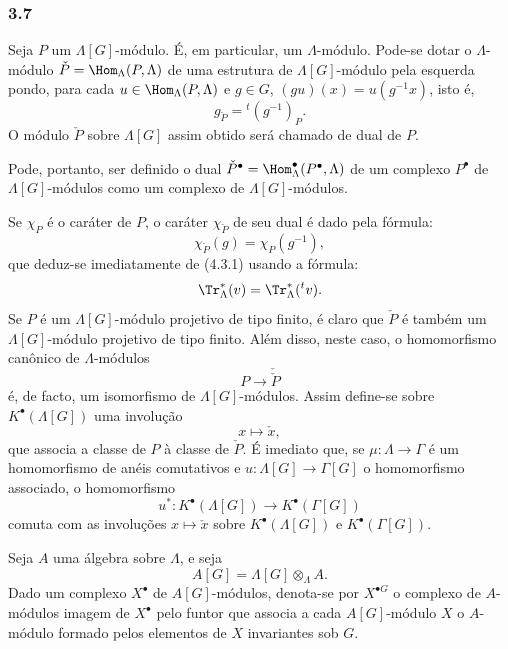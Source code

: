 \subsubsection*{3.7}

Seja $P$ um $\Lambda[G]$-módulo. É, em particular, um $\Lambda$-módulo. Pode-se dotar o $\Lambda$-módulo $\check P=\Hom_\Lambda(P,\Lambda)$ de uma estrutura de $\Lambda[G]$-módulo pela esquerda pondo, para cada $u\in\Hom_\Lambda(P,\Lambda)$ e $g\in G$, $(gu)(x)=u(g^{-1}x)$, isto é,
\[
g_{\check P}={}^{t}(g^{-1})_P.
\tag{3.7.1}
\]
O módulo $\check P$ sobre $\Lambda[G]$ assim obtido será chamado de dual de $P$.

Pode, portanto, ser definido o dual $\check P^\bullet=\Hom_\Lambda^\bullet(P^\bullet,\Lambda)$ de um complexo $P^\bullet$ de $\Lambda[G]$-módulos como um complexo de $\Lambda[G]$-módulos.

Se $\chi_P$ é o caráter de $P$, o caráter $\chi_{\check P}$ de seu dual é dado pela fórmula:
\[
\chi_{\check P}(g)=\chi_P(g^{-1}),
\tag{3.7.2}
\]
que deduz-se imediatamente de (4.3.1) usando a fórmula:
\[
\Tr_\Lambda^*(v)=\Tr_\Lambda^*({}^{t}v).
\]
Se $P$ é um $\Lambda[G]$-módulo projetivo de tipo finito, é claro que $\check P$ é também um $\Lambda[G]$-módulo projetivo de tipo finito. Além disso, neste caso, o homomorfismo canônico de $\Lambda$-módulos
\[
P\longrightarrow\check{\check P}
\]
é, de facto, um isomorfismo de $\Lambda[G]$-módulos. Assim define-se sobre $K^{\bullet}(\Lambda[G])$ uma involução
\[
x\longmapsto \check x,
\]
que associa a classe de $P$ à classe de $\check P$. É imediato que, se $\mu:\Lambda\to\Gamma$ é um homomorfismo de anéis comutativos e $u:\Lambda[G]\to\Gamma[G]$ o homomorfismo associado, o homomorfismo
\[
u^*:K^{\bullet}(\Lambda[G])\longrightarrow K^{\bullet}(\Gamma[G])
\]
comuta com as involuções $x\longmapsto \check x$ sobre $K^{\bullet}(\Lambda[G])$ e $K^{\bullet}(\Gamma[G])$.

Seja $A$ uma álgebra sobre $\Lambda$, e seja
\[
A[G]=\Lambda[G]\otimes_\Lambda A.
\]
Dado um complexo $X^\bullet$ de $A[G]$-módulos, denota-se por $X^{\bullet G}$ o complexo de $A$-módulos imagem de $X^\bullet$ pelo funtor que associa a cada $A[G]$-módulo $X$ o $A$-módulo formado pelos elementos de $X$ invariantes sob $G$.
